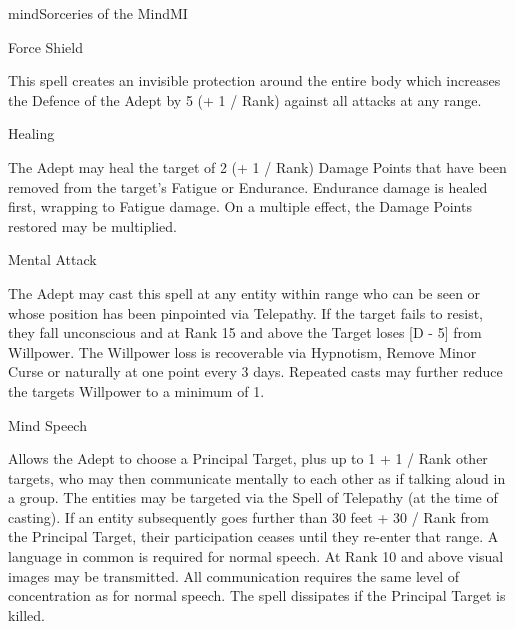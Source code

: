 \begin{college}[1.6]{mind}{Sorceries of the Mind}{MI}
\begin{spell}[S-2]{Force Shield}

\begin{effects}
This spell creates an invisible protection around the entire body
which increases the Defence of the Adept by 5 (+ 1 / Rank) against all
attacks at any range.
\end{effects}
\end{spell}

\begin{spell}[S-3]{Healing}

\begin{effects}
The Adept may heal the target of 2 (+ 1 / Rank) Damage Points that
have been removed from the target's Fatigue or Endurance. Endurance
damage is healed first, wrapping to Fatigue damage. On a multiple
effect, the Damage Points restored may be multiplied.
\end{effects}
\end{spell}

\begin{spell}[S-4]{Mental Attack}

\begin{effects}
The Adept may cast this spell at any entity within range who can be
seen or whose position has been pinpointed via Telepathy. If the
target fails to resist, they fall unconscious and at Rank 15 and above
the Target loses [D - 5] from Willpower.  The Willpower loss is
recoverable via Hypnotism, Remove Minor Curse or naturally at one
point every 3 days. Repeated casts may further reduce the targets
Willpower to a minimum of 1.
\end{effects}
\end{spell}

\begin{spell}[S-5]{Mind Speech}

\begin{effects}
Allows the Adept to choose a Principal Target, plus up to 1 + 1 / Rank
other targets, who may then communicate mentally to each other as if
talking aloud in a group.  The entities may be targeted via the Spell
of Telepathy (at the time of casting). If an entity subsequently goes
further than 30 feet + 30 / Rank from the Principal Target, their
participation ceases until they re-enter that range. A language in
common is required for normal speech. At Rank 10 and above visual
images may be transmitted. All communication requires the same level
of concentration as for normal speech. The spell dissipates if the
Principal Target is killed.


\end{effects}
\end{spell}
\end{college}

